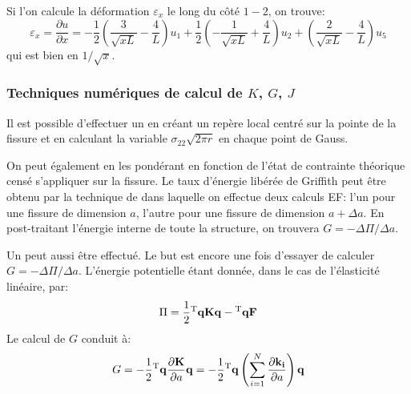 Si l'on calcule  la déformation $\varepsilon_x$ le long du côté $1-2$, on trouve:
\begin{equation} \varepsilon_x = \dfrac{\partial u}{\partial x} =
-\frac12\left( \frac3{\sqrt{xL}}-\frac4L\right)u_1 + \frac12\left(-\frac1{\sqrt{xL}}+\frac4L\right)u_2
+\left(\frac2{\sqrt{xL}}-\frac4L\right)u_5 \end{equation}
qui est bien en $1/\sqrt{x}$.

\medskip
\subsubsection{Techniques numériques de calcul de $K$, $G$, $J$}

Il est possible d'effectuer un  en créant
un repère local centré sur la pointe de la fissure et en calculant la variable
$\sigma_{22}\sqrt{2\pi r}$ en chaque point de Gauss.

\medskip
On peut également  en les pondérant en fonction
de l'état de contrainte théorique censé s'appliquer sur la fissure.
\medskipvm
Le taux d'énergie libérée de Griffith peut être
obtenu par la technique de  dans laquelle on effectue deux calculs EF:
l'un pour une fissure de dimension $a$, l'autre pour une fissure de dimension $a+\Delta a$.
En post-traitant l'énergie interne de toute la structure, on trouvera $G=-\Delta\Pi/\Delta a$.

\medskip
Un  peut aussi être effectué.
Le but est encore une fois d'essayer de calculer $G=-\Delta\Pi/\Delta a$.
L'énergie potentielle étant donnée, dans le cas de l'élasticité linéaire, par:
\begin{equation}\Pi = \frac12\LL{q}\MM{K}\VV{q}-\LL{q}\VV{F}\end{equation}
Le calcul de $G$ conduit à:
\begin{equation}G = -\frac12\LL{q}\dfrac{\partial\MM{K}}{\partial a}\VV{q} =
-\frac12\LL{q}\left(\dsum_{i=1}^N \dfrac{\partial\MM{k_i}}{\partial a}\right)\VV{q}\end{equation}


